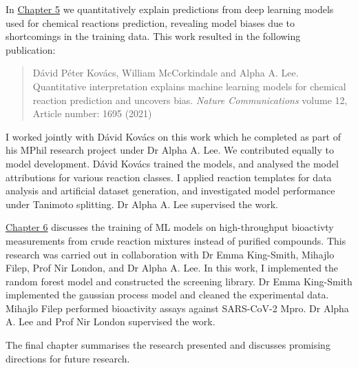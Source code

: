 In \hyperref[ch:transformer]{Chapter 5} we quantitatively explain predictions from deep learning models used for chemical reactions prediction, revealing model biases due to shortcomings in the training data. This work resulted in the following publication:
\begin{quote}
Dávid Péter Kovács, William McCorkindale and Alpha A. Lee. Quantitative interpretation explains machine learning models for chemical reaction prediction and uncovers bias. \textit{Nature Communications} volume 12, Article number: 1695 (2021)
\end{quote}
I worked jointly with Dávid Kovács on this work which he completed as part of his MPhil research project under Dr Alpha A. Lee. We contributed equally to model development. Dávid Kovács trained the models, and analysed the model attributions for various reaction classes. I applied reaction templates for data analysis and artificial dataset generation, and investigated model performance under Tanimoto splitting.  Dr Alpha A. Lee supervised the work.

\hyperref[ch:testing]{Chapter 6} discusses the training of ML models on high-throughput bioactivty measurements from crude reaction mixtures instead of purified compounds. This research was carried out in collaboration with Dr Emma King-Smith, Mihajlo Filep, Prof Nir London, and Dr Alpha A. Lee. In this work, I implemented the random forest model and constructed the screening library. Dr Emma King-Smith implemented the gaussian process model and cleaned the experimental data. Mihajlo Filep performed bioactivity assays against SARS-CoV-2 Mpro. Dr Alpha A. Lee and Prof Nir London supervised the work.

The final chapter summarises the research presented and discusses promising directions for future research.